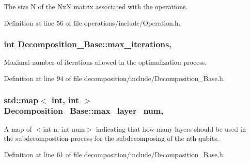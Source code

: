 The size N of the NxN matrix associated with the operations. 



Definition at line 56 of file operations/include/\+Operation.\+h.

\subsubsection[{\texorpdfstring{max\+\_\+iterations}{max_iterations}}]{\setlength{\rightskip}{0pt plus 5cm}int Decomposition\+\_\+\+Base\+::max\+\_\+iterations\hspace{0.3cm}{\ttfamily [protected]}, {\ttfamily [inherited]}}\hypertarget{class_decomposition___base_a89e74f075626c21e23228772bf8ad395}{}\label{class_decomposition___base_a89e74f075626c21e23228772bf8ad395}


Maximal number of iterations allowed in the optimalization process. 



Definition at line 94 of file decomposition/include/\+Decomposition\+\_\+\+Base.\+h.

\subsubsection[{\texorpdfstring{max\+\_\+layer\+\_\+num}{max_layer_num}}]{\setlength{\rightskip}{0pt plus 5cm}std\+::map$<$ int, int $>$ Decomposition\+\_\+\+Base\+::max\+\_\+layer\+\_\+num\hspace{0.3cm}{\ttfamily [protected]}, {\ttfamily [inherited]}}\hypertarget{class_decomposition___base_a861d7b10226fc13f05c131e18c8be908}{}\label{class_decomposition___base_a861d7b10226fc13f05c131e18c8be908}


A map of $<$int n\+: int num$>$ indicating that how many layers should be used in the subdecomposition process for the subdecomposing of the nth qubits. 



Definition at line 61 of file decomposition/include/\+Decomposition\+\_\+\+Base.\+h.

